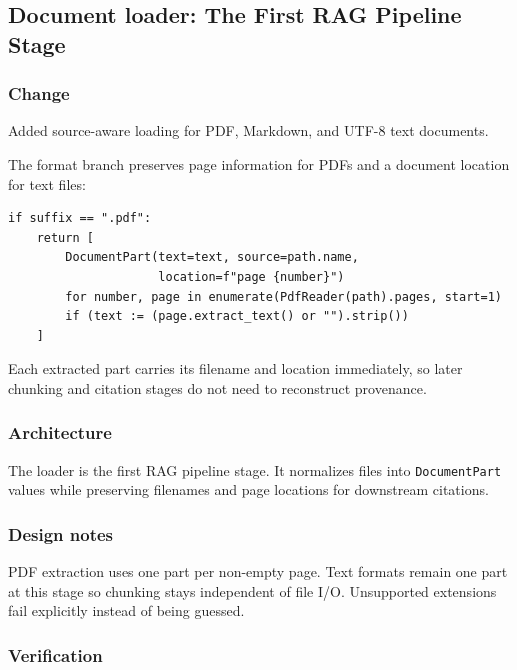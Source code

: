 
\subsection{Document loader: The First RAG Pipeline Stage}


\subsubsection{Change}

Added source-aware loading for PDF, Markdown, and UTF-8 text documents.

The format branch preserves page information for PDFs and a document location for text files:

\begin{verbatim}
if suffix == ".pdf":
    return [
        DocumentPart(text=text, source=path.name,
                     location=f"page {number}")
        for number, page in enumerate(PdfReader(path).pages, start=1)
        if (text := (page.extract_text() or "").strip())
    ]
\end{verbatim}

Each extracted part carries its filename and location immediately, so later chunking and citation stages do not need to reconstruct provenance.

\subsubsection{Architecture}

The loader is the first RAG pipeline stage. It normalizes files into \texttt{DocumentPart} values while preserving filenames and page locations for downstream citations.

\subsubsection{Design notes}

PDF extraction uses one part per non-empty page. Text formats remain one part at this stage so chunking stays independent of file I/O. Unsupported extensions fail explicitly instead of being guessed.

\subsubsection{Verification}

